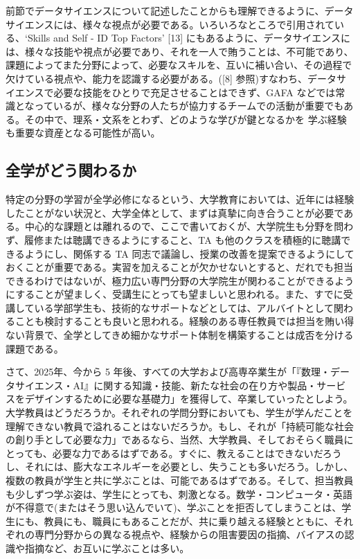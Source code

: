 \documentclass[
]{book}
\theoremstyle{definition}
\theoremstyle{definition}
\theoremstyle{definition}
\theoremstyle{definition}
\theoremstyle{remark}
\begin{document}
前節でデータサイエンスについて記述したことからも理解できるように、データサイエンスには、様々な視点が必要である。いろいろなところで引用されている、`Skills and Self - ID Top Factors' {[}13{]} にもあるように、データサイエンスには、様々な技能や視点が必要であり、それを一人で賄うことは、不可能であり、課題によってまた分野によって、必要なスキルを、互いに補い合い、その過程で欠けている視点や、能力を認識する必要がある。({[}8{]} 参照)すなわち、データサイエンスで必要な技能をひとりで充足させることはできず、GAFA などでは常識となっているが、様々な分野の人たちが協力するチームでの活動が重要でもある。その中で、理系・文系をとわず、どのような学びが鍵となるかを 学ぶ経験も重要な資産となる可能性が高い。

\hypertarget{ux5168ux5b66ux304cux3069ux3046ux95a2ux308fux308bux304b}{%
\subsection{全学がどう関わるか}\label{ux5168ux5b66ux304cux3069ux3046ux95a2ux308fux308bux304b}}

特定の分野の学習が全学必修になるという、大学教育においては、近年には経験したことがない状況と、大学全体として、まずは真摯に向き合うことが必要である。中心的な課題とは離れるので、ここで書いておくが、大学院生も分野を問わず、履修または聴講できるようにすること、TA も他のクラスを積極的に聴講できるようにし、関係する TA 同志で議論し、授業の改善を提案できるようにしておくことが重要である。実習を加えることが欠かせないとすると、だれでも担当できるわけではないが、極力広い専門分野の大学院生が関わることができるようにすることが望ましく、受講生にとっても望ましいと思われる。また、すでに受講している学部学生も、技術的なサポートなどとしては、アルバイトとして関わることも検討することも良いと思われる。経験のある専任教員では担当を賄い得ない背景で、全学としてきめ細かなサポート体制を構築することは成否を分ける課題である。

さて、2025年、今から 5 年後、すべての大学および高専卒業生が「『数理・データサイエンス・AI』に関する知識・技能、新たな社会の在り方や製品・サービスをデザインするために必要な基礎力」を獲得して、卒業していったとしよう。大学教員はどうだろうか。それぞれの学問分野においても、学生が学んだことを理解できない教員で溢れることはないだろうか。もし、それが「持続可能な社会の創り手として必要な力」であるなら、当然、大学教員、そしておそらく職員にとっても、必要な力であるはずである。すぐに、教えることはできないだろうし、それには、膨大なエネルギーを必要とし、失うことも多いだろう。しかし、複数の教員が学生と共に学ぶことは、可能であるはずである。そして、担当教員も少しずつ学ぶ姿は、学生にとっても、刺激となる。数学・コンピュータ・英語が不得意で(またはそう思い込んでいて)、学ぶことを拒否してしまうことは、学生にも、教員にも、職員にもあることだが、共に乗り越える経験とともに、それぞれの専門分野からの異なる視点や、経験からの阻害要因の指摘、バイアスの認識や指摘など、お互いに学ぶことは多い。
\end{document}
